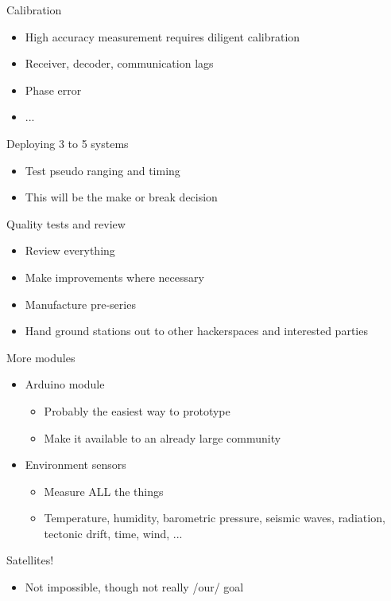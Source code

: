 	\begin{frame}{Calibration}
		\begin{itemize}
			\item High accuracy measurement requires diligent calibration
			\item Receiver, decoder, communication lags
			\item Phase error
			\item ...
		\end{itemize}
	\end{frame}
	\begin{frame}{Deploying 3 to 5 systems}
		\begin{itemize}
			\item Test pseudo ranging and timing
			\item This will be the make or break decision
		\end{itemize}
	\end{frame}
	\begin{frame}{Quality tests and review}
		\begin{itemize}
			\item Review everything
			\item Make improvements where necessary
			\item Manufacture pre-series
			\item Hand ground stations out to other hackerspaces and interested parties
		\end{itemize}
	\end{frame}
	\begin{frame}{More modules}
		\begin{itemize}
			\item Arduino module
			\begin{itemize}
				\item Probably the easiest way to prototype
				\item Make it available to an already large community
			\end{itemize}
			\item Environment sensors
			\begin{itemize}
				\item Measure ALL the things
				\item Temperature, humidity, barometric pressure, seismic waves, radiation, tectonic drift, time, wind, ...
			\end{itemize}
		\end{itemize}
	\end{frame}
	\begin{frame}{Satellites!}
		\begin{itemize}
			\item Not impossible, though not really /our/ goal
		\end{itemize}
	\end{frame}

